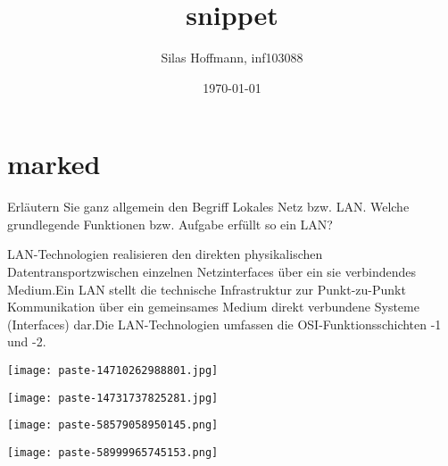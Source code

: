 \documentclass{article}
\title{snippet}
\author{Silas Hoffmann, inf103088}
\date{\today}
\begin{document}
\maketitle
\vspace{0.5cm}
\tableofcontents
\clearpage

\section{marked}
\begin{tcolorbox}[colback=white!10!white,colframe=lightgray!75!black,
  savelowerto=\jobname_ex.tex,breakable,enhanced,lines before break=40]

\justifying
Erläutern Sie ganz allgemein den Begriff Lokales Netz bzw. LAN. Welche grundlegende Funktionen bzw. Aufgabe erfüllt so ein LAN?

\tcblower

\justifying
LAN-Technologien realisieren den direkten physikalischen Datentransportzwischen einzelnen Netzinterfaces über ein sie verbindendes Medium.Ein LAN stellt die technische Infrastruktur zur Punkt-zu-Punkt Kommunikation über ein gemeinsames Medium direkt verbundene Systeme (Interfaces) dar.Die LAN-Technologien umfassen die OSI-Funktionsschichten -1 und -2.\begin{center}
\texttt{[image: paste-14710262988801.jpg]}
\end{center}
\begin{center}
\texttt{[image: paste-14731737825281.jpg]}
\end{center}
\begin{center}
\texttt{[image: paste-58579058950145.png]}
\end{center}
\begin{center}
\texttt{[image: paste-58999965745153.png]}
\end{center}

\end{tcolorbox}
\end{document}
